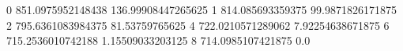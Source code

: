 0 851.0975952148438 136.99908447265625
1 814.085693359375 99.9871826171875
2 795.6361083984375 81.53759765625
4 722.0210571289062 7.92254638671875
6 715.2536010742188 1.15509033203125
8 714.0985107421875 0.0
